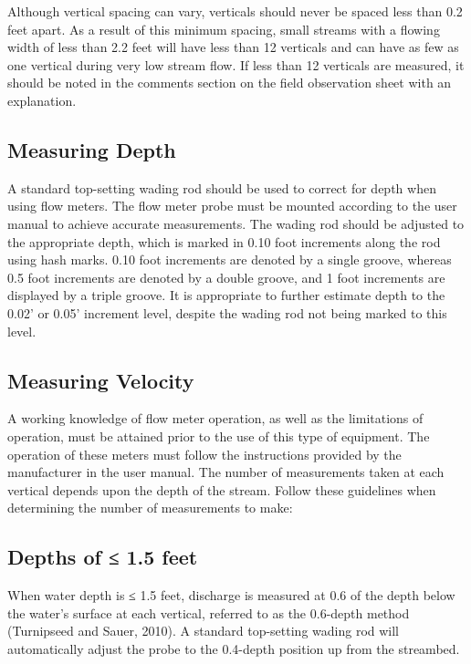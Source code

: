 \documentclass[12pt]{../SOP3_beta}\usepackage[]{graphicx}\usepackage[]{xcolor}
\begin{document}
\NP Although vertical spacing can vary, verticals should never be spaced less than 0.2 feet
apart. As a result of this minimum spacing, small streams with a flowing width of less
than 2.2 feet will have less than 12 verticals and can have as few as one vertical during
very low stream flow. If less than 12 verticals are measured, it should be noted in the
comments section on the field observation sheet with an explanation.

\subsection{Measuring Depth}

A standard top-setting wading rod should be used to correct for depth when using flow
meters. The flow meter probe must be mounted according to the user manual to
achieve accurate measurements. The wading rod should be adjusted to the appropriate
depth, which is marked in 0.10 foot increments along the rod using hash marks. 0.10
foot increments are denoted by a single groove, whereas 0.5 foot increments are
denoted by a double groove, and 1 foot increments are displayed by a triple groove. It
is appropriate to further estimate depth to the 0.02’ or 0.05’ increment level, despite
the wading rod not being marked to this level.

\subsection{Measuring Velocity}

A working knowledge of flow meter operation, as well as the limitations of operation,
must be attained prior to the use of this type of equipment. The operation of these
meters must follow the instructions provided by the manufacturer in the user manual.
The number of measurements taken at each vertical depends upon the depth of the
stream. Follow these guidelines when determining the number of measurements to
make:

\subsection{Depths of ≤ 1.5 feet}

When water depth is ≤ 1.5 feet, discharge is measured at 0.6 of the depth below the
water’s surface at each vertical, referred to as the 0.6-depth method (Turnipseed and
Sauer, 2010). A standard top-setting wading rod will automatically adjust the probe to
the 0.4-depth position up from the streambed.
\end{document}
